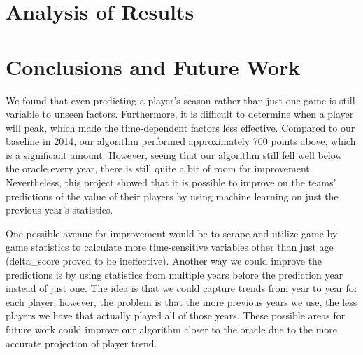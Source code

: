 \documentclass[12pt]{amsart}
\begin{document}
\section{\large Analysis of Results}


\section{\large Conclusions and Future Work}
We found that even predicting a player's season rather than just one game is still variable to unseen factors. Furthermore, it is difficult to determine when a player will peak, which made the time-dependent factors less effective. Compared to our baseline in 2014, our algorithm performed approximately 700 points above, which is a significant amount. However, seeing that our algorithm still fell well below the oracle every year, there is still quite a bit of room for improvement. Nevertheless, this project showed that it is possible to improve on the teams' predictions of the value of their players by using machine learning on just the previous year's statistics.
\vspace{.4cm}

One possible avenue for improvement would be to scrape and utilize game-by-game statistics to calculate more time-sensitive variables other than just age (delta\_score proved to be ineffective). Another way we could improve the predictions is by using statistics from multiple years before the prediction year instead of just one. The idea is that we could capture trends from year to year for each player; however, the problem is that the more previous years we use, the less players we have that actually played all of those years. These possible areas for future work could improve our algorithm closer to the oracle due to the more accurate projection of player trend.
\end{document}

